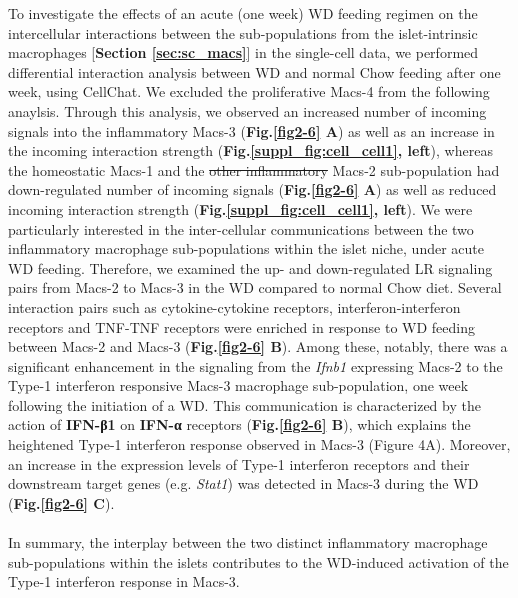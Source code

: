 To investigate the effects of an acute (one week) WD feeding regimen on the intercellular interactions between the sub-populations from the islet-intrinsic macrophages [\textbf{Section \ref{sec:sc_macs}}] in the single-cell data, we performed differential interaction analysis between WD and normal Chow feeding after one week, using CellChat. We excluded the proliferative Macs-4 from the following anaylsis. Through this analysis, we observed an increased number of incoming signals into the inflammatory Macs-3 (\textbf{Fig.\ref{fig2-6} A}) as well as an increase in the incoming interaction strength (\textbf{Fig.\ref{suppl_fig:cell_cell1}, left}), whereas the homeostatic Macs-1 and the \st{other inflammatory} Macs-2 sub-population had down-regulated number of incoming signals (\textbf{Fig.\ref{fig2-6} A}) as well as reduced incoming interaction strength (\textbf{Fig.\ref{suppl_fig:cell_cell1}, left}). We were particularly interested in the inter-cellular communications between the two inflammatory macrophage sub-populations within the islet niche, under acute WD feeding. Therefore, we examined the up- and down-regulated LR signaling pairs from Macs-2 to Macs-3 in the WD compared to normal Chow diet. Several interaction pairs such as cytokine-cytokine receptors, interferon-interferon receptors and TNF-TNF receptors were enriched in response to WD feeding between Macs-2 and Macs-3 (\textbf{Fig.\ref{fig2-6} B}).  Among these, notably, there was a significant enhancement in the signaling from the \textit{Ifnb1} expressing Macs-2 to the Type-1 interferon responsive Macs-3 macrophage sub-population, one week following the initiation of a WD. This communication is characterized by the action of \textbf{IFN-β1} on \textbf{IFN-α} receptors (\textbf{Fig.\ref{fig2-6} B}), which explains the heightened Type-1 interferon response observed in Macs-3 (Figure 4A). Moreover, an increase in the expression levels of Type-1 interferon receptors and their downstream target genes (e.g. \textit{Stat1}) was detected in Macs-3 during the WD (\textbf{Fig.\ref{fig2-6} C}).\\\\In summary, the interplay between the two distinct inflammatory macrophage sub-populations within the islets contributes to the WD-induced activation of the Type-1 interferon response in Macs-3. 

